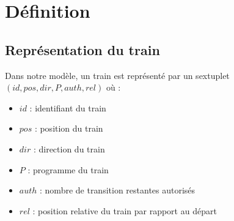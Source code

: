 \documentclass[12pt]{article}
\begin{document}
\newcommand\ruleUntilConsEv[4]{ %
    \inferrule
    { suiv(#2, #3) = #4 \\ #2 \neq #4 \\ R.A[#1] \neq #2 \\ ev(#1, #4) \in R.E \\ apply(R, ev(#1, #4)) = R'}
    {\trainfull{#1}{#2}{#3}{\concat{Until(#4)}{P'}}, R \Rightarrow \trainfull{#1}{#4}{#3}{P'}, R'}
}

\newcommand\ruleWait[4]{ %
    \inferrule
    {R.A[#1] = #2 \\ ev(#1,#2) \in R.E \\ R.E[ev[#1, #2]].P = att(#4)  \\ apply(R, ev(#1, #2)) = R'}
    {\trainfull{#1}{#2}{#3}{P}, R \Rightarrow \trainfull{#1}{#2}{#3}{P}, R'}
}

\newcommand\ruleCrash[2]{ %
    \inferrule
        {#1 \neq #2}
        {\Gamma, \train{#1}{pos}{dir}{P}, \train{#2}{pos}{dir'}{P'}  \Rightarrow \bot}
}

\newcommand\ruleCrashSec[3]{ %
    \inferrule
        {\lnot suiv(#2, #3) = \emptyset \\ #3 \neq * \\ R.A[#1] \neq #2}
        {\trainfull{#1}{#2}{#3}{P}, R \Rightarrow \bot}
}
\fi



\maketitle


\section{Définition}

\subsection{Représentation du train}
Dans notre modèle, un train est représenté par un sextuplet $(id, pos, dir, P, auth, rel)$ où :
\begin{itemize}
    \item $id$ : identifiant du train
    \item $pos$ : position du train 
    \item $dir$ : direction du train
    \item $P$ : programme du train
    \item $auth$ : nombre de transition restantes autorisés
    \item $rel$ : position relative du train par rapport au départ
\end{itemize}
\end{document}
